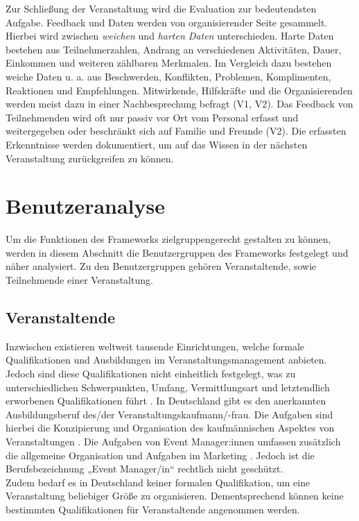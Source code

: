 Zur Schließung der Veranstaltung wird die Evaluation zur bedeutendsten Aufgabe.
Feedback und Daten werden von organisierender Seite gesammelt. Hierbei wird
zwischen \textit{weichen} und \textit{harten Daten} unterschieden. Harte Daten
bestehen aus Teilnehmerzahlen, Andrang an verschiedenen Aktivitäten, Dauer,
Einkommen und weiteren zählbaren Merkmalen. Im Vergleich dazu bestehen weiche
Daten u. a. aus Beschwerden, Konflikten, Problemen, Komplimenten, Reaktionen und
Empfehlungen. Mitwirkende, Hilfskräfte und die Organisierenden werden meist dazu
in einer Nachbesprechung befragt (V1, V2). Das Feedback von Teilnehmenden wird
oft nur passiv vor Ort vom Personal erfasst und weitergegeben oder beschränkt
sich auf Familie und Freunde (V2). Die erfassten Erkenntnisse werden
dokumentiert, um auf das Wissen in der nächsten Veranstaltung zurückgreifen zu
können.


\section{Benutzeranalyse} \label{sec:analysis-user}

Um die Funktionen des Frameworks zielgruppengerecht gestalten zu können, werden
in diesem Abschnitt die Benutzergruppen des Frameworks festgelegt und näher
analysiert. Zu den Benutzergruppen gehören Veranstaltende, sowie Teilnehmende
einer Veranstaltung.

\subsection{Veranstaltende} \label{ssec:analysis-user-v}

Inzwischen existieren weltweit tausende Einrichtungen, welche formale
Qualifikationen und Ausbildungen im Veranstaltungsmanagement anbieten. Jedoch
sind diese Qualifikationen nicht einheitlich festgelegt, was zu
unterschiedlichen Schwerpunkten, Umfang, Vermittlungsart und letztendlich
erworbenen Qualifikationen führt \cite{Bladen2012}. In Deutschland gibt es den
anerkannten Ausbildungsberuf des/der Veranstaltungs\-kaufmann/-frau. Die
Aufgaben sind hierbei die Konzipierung und Organisation des kaufmännischen
Aspektes von Veranstaltungen \cite{Kultusministerkonferenz2001}. Die Aufgaben
von Event Manager:innen umfassen zusätzlich die allgemeine Organisation und
Aufgaben im Marketing \cite{BundesagenturfurArbeit2021}. Jedoch ist die
Berufsbezeichnung „Event Manager/in“ rechtlich nicht geschützt. \\
Zudem bedarf es in Deutschland keiner formalen Qualifikation, um eine
Veranstaltung beliebiger Größe zu organisieren. Dementsprechend können keine
bestimmten Qualifikationen für Veranstaltende angenommen werden.

